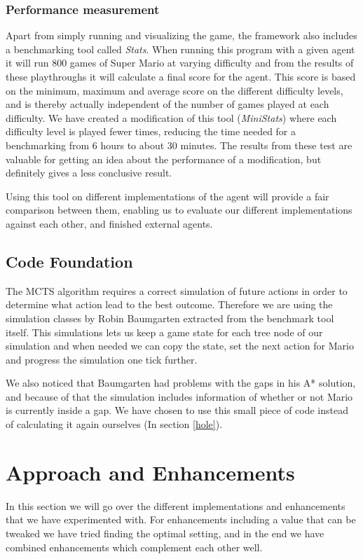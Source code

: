 \documentclass[10pt,a4paper]{article}
\begin{document}
\subsubsection{Performance measurement}
\label{benchmark}
Apart from simply running and visualizing the game, the framework also includes a benchmarking tool called \emph{Stats}. When running this program with a given agent it will run 800 games of Super Mario at varying difficulty and from the results of these playthroughs it will calculate a final score for the agent. This score is based on the minimum, maximum and average score on the different difficulty levels, and is thereby actually independent of the number of games played at each difficulty. We have created a modification of this tool (\emph{MiniStats}) where each difficulty level is played fewer times, reducing the time needed for a benchmarking from 6 hours to about 30 minutes. The results from these test are valuable for getting an idea about the performance of a modification, but definitely gives a less conclusive result.

Using this tool on different implementations of the agent will provide a fair comparison between them, enabling us to evaluate our different implementations against each other, and finished external agents.

\subsection{Code Foundation}
The MCTS algorithm requires a correct simulation of future actions in order to determine what action lead to the best outcome. Therefore we are using the simulation classes by Robin Baumgarten extracted from the benchmark tool itself. This simulations lets us keep a game state for each tree node of our simulation and when needed we can copy the state, set the next action for Mario and progress the simulation one tick further.

We also noticed that Baumgarten had problems with the gaps in his A* solution, and because of that the simulation includes information of whether or not Mario is currently inside a gap. We have chosen to use this small piece of code instead of calculating it again ourselves (In section \ref{hole}).

\clearpage

\section{Approach and Enhancements}
In this section we will go over the different implementations and enhancements that we have experimented with. For enhancements including a value that can be tweaked we have tried finding the optimal setting, and in the end we have combined enhancements which complement each other well.
\end{document}

